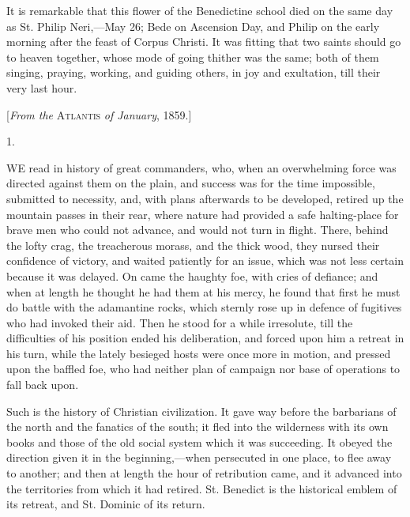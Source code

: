 It is remarkable that this flower of the Benedictine school died on
the same day as St. Philip Neri,—May 26; Bede on Ascension Day, and
Philip on the early morning after the feast of Corpus Christi. It was
fitting that two saints should go to heaven together, whose mode of
going thither was the same; both of them singing, praying, working,
and guiding others, in joy and exultation, till their very last hour.


[\emph{From the} A\textsc{tlantis} \emph{of January},
1859.]

1.

WE read in history of great commanders,
who, when an overwhelming force was directed against them on the
plain, and success was for the time impossible, submitted to
necessity, and, with plans afterwards to be developed, retired up the
mountain passes in their rear, where nature had provided a safe
halting-place for brave men who could not advance, and would not turn
in flight. There, behind the lofty crag, the treacherous morass, and
the thick wood, they nursed their confidence of victory, and waited
patiently for an issue, which was not less certain because it was
delayed. On came the haughty foe, with cries of defiance; and when at
length he thought he had them at his mercy, he found that first he
must do battle with the adamantine rocks, which sternly rose up in
defence of fugitives who had invoked their aid. Then he stood for a
while irresolute, till the difficulties of his position ended his
deliberation, and forced upon him a retreat in his turn, while the
lately besieged hosts were once more in motion, and pressed upon the
baffled foe, who had neither plan of campaign nor base of operations
to fall back upon.

Such is the history of Christian civilization. It gave way
before the barbarians of the north and the fanatics of the south; it
fled into the wilderness with its own books and those of the old
social system which it was succeeding. It obeyed the direction given
it in the beginning,—when persecuted in one place, to flee away to
another; and then at length the hour of retribution came, and it
advanced into the territories from which it had retired. St. Benedict
is the historical emblem of its retreat, and St. Dominic of its
return.

